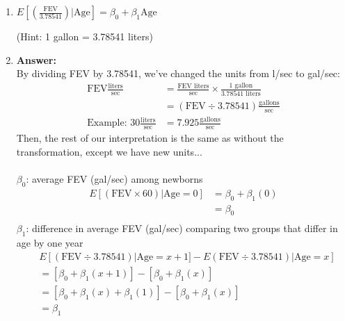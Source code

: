 \documentclass{article}
\begin{document}
\begin{enumerate}
\newpage
\item $E[\left(\frac{\text{FEV}}{3.78541}\right)|\text{Age}] = \beta_0 + \beta_1 \text{Age}$ \begin{scriptsize}(Hint: 1 gallon = 3.78541 liters)\end{scriptsize}
\item[] \color{blue} \textbf{Answer:} \\
By dividing FEV by 3.78541, we've changed the units from l/sec to gal/sec:
\begin{align*}
\text{FEV}\frac{\text{liters}}{\text{sec}} & =\frac{\text{FEV liters}}{\text{sec}} \times \frac{1\text{ gallon}}{ 3.78541\text{ liters}} \\ 
& = (\text{FEV} \div 3.78541) \frac{\text{gallons}}{\text{sec}}\\
\text{Example: } 30\frac{\text{liters}}{\text{sec}} &= 7.925\frac{\text{gallons}}{\text{sec}}
\end{align*}
Then, the rest of our interpretation is the same as without the transformation, except we have new units...\\ \\
$\beta_0$: average FEV (gal/sec) among newborns \\
\begin{align*}
E[(\text{FEV}\times 60)|\text{Age} = 0] & = \beta_0+ \beta_1(0) \\
& = \beta_0 \\
\end{align*}
$\beta_1$: difference in average FEV (gal/sec) comparing two groups that differ in age by one year
\begin{align*}
&E[(\text{FEV}\div 3.78541 )|\text{Age} = x + 1] - E(\text{FEV}\div 3.78541 )|\text{Age} = x ] \\
&=\left[\beta_0 + \beta_1\left( x + 1\right)\right] - \left[\beta_0 + \beta_1\left( x \right)\right] \\
&=\left[\beta_0 + \beta_1(x) + \beta_1 (1)\right] -\left[\beta_0 + \beta_1(x)\right]\\
& = \beta_1
\end{align*}
\color{black}
\end{enumerate}
\end{document}
